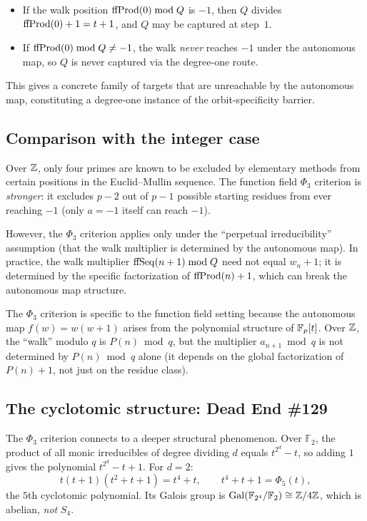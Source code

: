 \begin{itemize}
  \item If the walk position $\mathrm{ffProd}(0) \bmod Q$ is $-1$, then $Q$ divides
    $\mathrm{ffProd}(0) + 1 = t + 1$, and $Q$ may be captured at step~$1$.
  \item If $\mathrm{ffProd}(0) \bmod Q \neq -1$, the walk \emph{never} reaches $-1$
    under the autonomous map, so $Q$ is never captured via the degree-one
    route.
\end{itemize}

This gives a concrete family of targets that are unreachable by the
autonomous map, constituting a degree-one instance of the orbit-specificity
barrier.

\subsection{Comparison with the integer case}

Over $\mathbb{Z}$, only four primes are known to be excluded by elementary methods
from certain positions in the Euclid--Mullin sequence. The function field
$\Phi_3$ criterion is \emph{stronger}: it excludes $p - 2$ out of $p - 1$
possible starting residues from ever reaching $-1$ (only $a = -1$ itself
can reach $-1$).

However, the $\Phi_3$ criterion applies only under the ``perpetual
irreducibility'' assumption (that the walk multiplier is determined by
the autonomous map). In practice, the walk multiplier $\mathrm{ffSeq}(n+1)
\bmod Q$ need not equal $w_n + 1$; it is determined by the specific
factorization of $\mathrm{ffProd}(n) + 1$, which can break the autonomous map
structure.

\begin{remark}
The $\Phi_3$ criterion is specific to the function field setting because
the autonomous map $f(w) = w(w+1)$ arises from the polynomial structure
of $\mathbb{F}_p[t]$. Over $\mathbb{Z}$, the ``walk'' modulo $q$ is $P(n) \bmod q$, but
the multiplier $a_{n+1} \bmod q$ is not determined by $P(n) \bmod q$
alone (it depends on the global factorization of $P(n)+1$, not just on
the residue class).
\end{remark}

\subsection{The cyclotomic structure: Dead End \#129}

The $\Phi_3$ criterion connects to a deeper structural phenomenon. Over
$\mathbb{F}_2$, the product of all monic irreducibles of degree dividing $d$
equals $t^{2^d} - t$, so adding $1$ gives the polynomial $t^{2^d} - t + 1$.
For $d = 2$:
\[
  t(t+1)(t^2+t+1) = t^4 + t, \qquad
  t^4 + t + 1 = \Phi_5(t),
\]
the $5$th cyclotomic polynomial. Its Galois group is
$\mathrm{Gal}(\mathbb{F}_{2^4}/\mathbb{F}_2) \cong \mathbb{Z}/4\mathbb{Z}$, which is
abelian, \emph{not} $S_4$.

